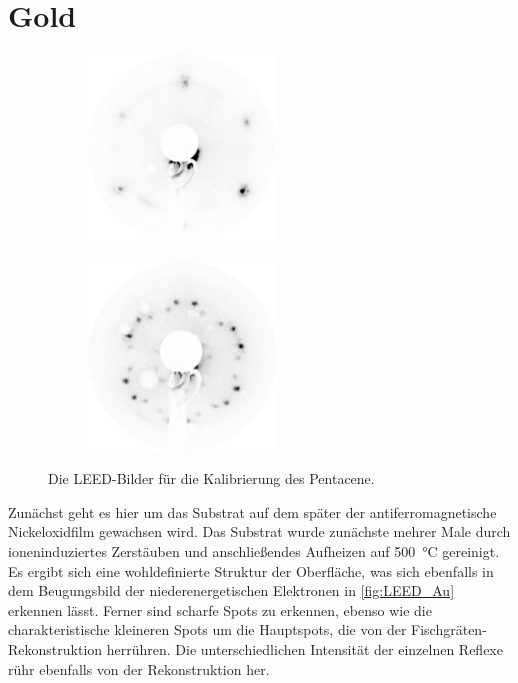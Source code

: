     \section{Gold}
        \begin{figure}
            \centering
            \begin{subfigure}{0.48\textwidth}
                \centering
                \includegraphics[height=5cm]{./content/pictures/Au/2021_06_08_002_Au(111)_75eV}
                \label{fig:LEED_Au}
            \end{subfigure}
            \begin{subfigure}{0.48\textwidth}
                \centering
                \includegraphics[height=5cm]{./content/pictures/Au+5A/021_Au(111)+5A(40)_16eV.png}
                \label{fig:LEED_Au+5A}
            \end{subfigure}
            \caption{Die LEED-Bilder für die Kalibrierung des Pentacene.}
        \label{fig:Substrate}
        \end{figure}
        Zunächst geht es hier um das Substrat auf dem später der antiferromagnetische Nickeloxidfilm gewachsen wird.
        Das Substrat wurde zunächste mehrer Male durch ioneninduziertes Zerstäuben und anschließendes Aufheizen auf \SI{500}{\celsius} gereinigt.
        Es ergibt sich eine wohldefinierte Struktur der Oberfläche, was sich ebenfalls in dem Beugungsbild der niederenergetischen Elektronen in \autoref{fig:LEED_Au} erkennen lässt.
        Ferner sind scharfe Spots zu erkennen, ebenso wie die charakteristische kleineren Spots um die Hauptspots, die von der Fischgräten-Rekonstruktion herrühren.
        Die unterschiedlichen Intensität der einzelnen Reflexe rühr ebenfalls von der Rekonstruktion her.

